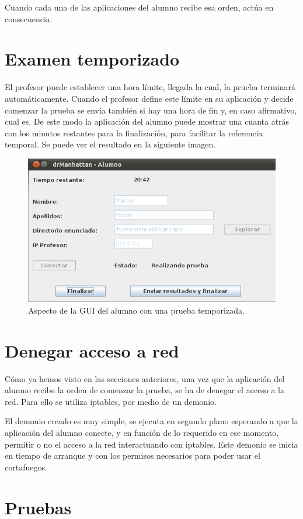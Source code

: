 Cuando cada una de las aplicaciones del alumno recibe esa orden, actúa en consecuencia.

\section{Examen temporizado}
\label{sec:iteracion:examenTemporizado}

El profesor puede establecer una hora límite, llegada la cual, la prueba terminará automáticamente. Cuando el profesor define este límite en su aplicación y decide comenzar la prueba se envía también si hay una hora de fin y, en caso afirmativo, cual es. De este modo la aplicación del alumno puede mostrar una cuanta atrás con los minutos restantes para la finalización, para facilitar la referencia temporal. Se puede ver el resultado en la siguiente imagen.

\begin{figure}[!htb]
    \centering
    \includegraphics[width=.75\linewidth]{iteracion/tiempoRestante}
    \caption{Aspecto de la GUI del alumno con una prueba temporizada.}
    \label{fig:iteracion:tiempoRestante}
\end{figure}


\section{Denegar acceso a red}
\label{sec:iteracion:denegarRed}

Cómo ya hemos visto en las secciones anteriores, una vez que la aplicación del alumno recibe la orden de comenzar la prueba, se ha de denegar el acceso a la red. Para ello se utiliza iptables, por medio de un demonio.

El demonio creado es muy simple, se ejecuta en segundo plano esperando a que la aplicación del alumno conecte, y en función de lo requerido en ese momento, permitir o no el acceso a la red interactuando con iptables. Este demonio se inicia en tiempo de arranque y con los permisos necesarios para poder usar el cortafuegos.


\section{Pruebas}
